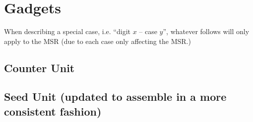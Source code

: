 \section{Gadgets}
\label{gadgets}



\newcommand{\warpunit}{{\tt Warp\_Unit}}
\newcommand{\prewarp}{{\tt Pre\_Warp}}
\newcommand{\firstwarp}{{\tt First\_Warp}}
\newcommand{\warpbridge}{{\tt Warp\_Bridge}}
\newcommand{\secondwarp}{{\tt Second\_Warp}}
\newcommand{\postwarp}{{\tt Post\_Warp}}

\newcommand{\dtop}{{\tt Digit\_Top}}
\newcommand{\dwriter}{{\tt Digit\_Writer}}
\newcommand{\dreader}{{\tt Digit\_Reader}}

\newcommand{\returnfromdonereadnextrow}{{\tt Return\_From\_Digit1\_Read\_Next\_Row}}
\newcommand{\returnfromdtworeadnextrow}{{\tt Return\_From\_Digit2\_Read\_Next\_Row}}
\newcommand{\returnfromdthreereadnextrow}{{\tt Return\_From\_Digit3\_Read\_Next\_Row}}

\newcommand{\returnfromdonereaddtwo}{{\tt Return\_From\_Digit1\_Read\_Digit2}}
\newcommand{\returnfromdonereaddtwocasetwo}{{\tt Return\_From\_Digit1\_Read\_Digit2\_Case2}}
\newcommand{\returnfromdtworeaddthree}{{\tt Return\_From\_Digit2\_Read\_Digit3}}
\newcommand{\returnfromdthreereaddone}{{\tt Return\_From\_Digit3\_Read\_Digit1}}

\newcommand{\inc}{{\tt op}}

\newcommand{\dtopdonecaseone}{{\tt Digit\_Top\_Digit1\_Case1}}
\newcommand{\dtopdonecasetwo}{{\tt Digit\_Top\_Digit1\_Case2}}
\newcommand{\dtopdtwocasetwo}{{\tt Digit\_Top\_Digit2\_Case2}}
\newcommand{\dtopcasethree}{{\tt Digit\_Top\_Case3}}

When describing a special case, i.e. ``digit $x$ -- case $y$'', whatever follows
will only apply to the MSR (due to each case only affecting the MSR.)

\subsection{ Counter Unit }


    
    



    
    
    
    

    \subsection{Seed Unit (updated to assemble in a more consistent fashion)}

